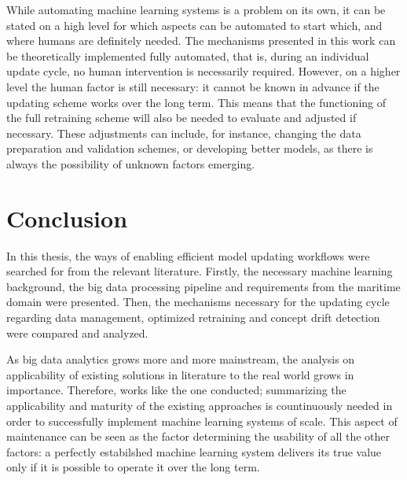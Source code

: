 While automating machine learning systems is a problem on its own, it can be stated on a high level for which aspects can be automated to start which, and where humans are definitely needed. The mechanisms presented in this work can be theoretically implemented fully automated, that is, during an individual update cycle, no human intervention is necessarily required. However, on a higher level the human factor is still necessary: it cannot be known in advance if the updating scheme works over the long term. This means that the functioning of the full retraining scheme will also be needed to evaluate and adjusted if necessary. These adjustments can include, for instance, changing the data preparation and validation schemes, or developing better models, as there is always the possibility of unknown factors emerging.


\chapter{Conclusion}

In this thesis, the ways of enabling efficient model updating workflows were searched for from the relevant literature. Firstly, the necessary machine learning background, the big data processing pipeline and requirements from the maritime domain were presented. Then, the mechanisms necessary for the updating cycle regarding data management, optimized retraining and concept drift detection were compared and analyzed.

As big data analytics grows more and more mainstream, the analysis on applicability of existing solutions in literature to the real world grows in importance. Therefore, works like the one conducted; summarizing the applicability and maturity of the existing approaches is countinuously needed in order to successfully implement machine learning systems of scale. This aspect of maintenance can be seen as the factor determining the usability of all the other factors: a perfectly estabilshed machine learning system delivers its true value only if it is possible to operate it over the long term.

